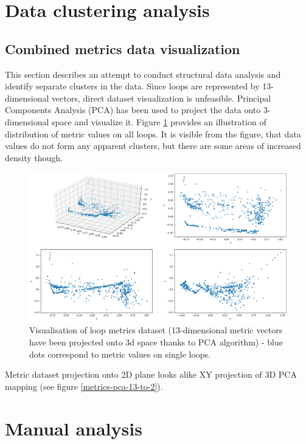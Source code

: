 \section{Data clustering analysis}
\label{analysis-data-clustering-analysis}

\subsection{Combined metrics data visualization}
\label{analysis-data-clustering-analysis}
\qquad This section describes an attempt to conduct structural data analysis and identify separate clusters in the data. Since loops are represented by 13-dimensional vectors, direct dataset visualization is unfeasible. Principal Components Analysis (PCA) has been used to project the data onto 3-dimensional space and visualize it. Figure \ref{metrics-pca-13-to-3} provides an illustration of distribution of metric values on all loops. It is visible from the figure, that data values do not form any apparent clusters, but there are some areas of increased density though.
\begin{figure}[htb]
\centering
\includegraphics[width=\linewidth]{figs/metrics-pca-13-to-3.png}
\caption{Visualisation of loop metrics dataset (13-dimensional metric vectors have been projected onto 3d space thanks to PCA algorithm) - blue dots correspond to metric values on single loops.}
\label{metrics-pca-13-to-3}
\end{figure}

\qquad Metric dataset projection onto 2D plane looks alike XY projection of 3D PCA mapping (see figure \ref{metrics-pca-13-to-2}).

\section{Manual analysis}
\label{analysis-manual-analysis}

